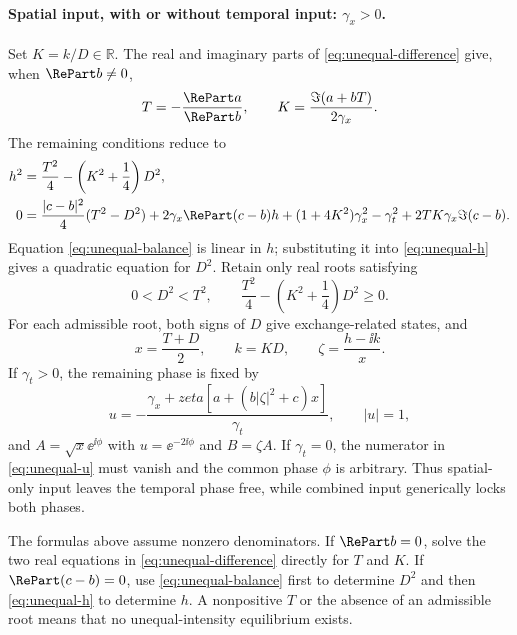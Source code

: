 \paragraph{Spatial input, with or without temporal input: $\gamma_x>0$.}
Set $K=k/D\in\mathbb R$.  The real and imaginary parts of
\eqref{eq:unequal-difference} give, when $\RePart b\neq0$,
\begin{equation}
 T=-\frac{\RePart a}{\RePart b},
 \qquad
 K=\frac{\Im(a+bT)}{2\gamma_x}.
 \label{eq:unequal-TK}
\end{equation}
The remaining conditions reduce to
\begin{subequations}
\label{eq:unequal-scalar-system}
\begin{align}
 h^2&=\frac{T^2}{4}-\left(K^2+\frac14\right)D^2,
 \label{eq:unequal-h}\\
 0&=\frac{|c-b|^2}{4}(T^2-D^2)
 +2\gamma_x\RePart(c-b)h
 +(1+4K^2)\gamma_x^2-\gamma_t^2
 +2TK\gamma_x\Im(c-b).
 \label{eq:unequal-balance}
\end{align}
\end{subequations}
Equation \eqref{eq:unequal-balance} is linear in $h$; substituting it into
\eqref{eq:unequal-h} gives a quadratic equation for $D^2$.  Retain only
real roots satisfying
\begin{equation}
 0<D^2<T^2,
 \qquad
 \frac{T^2}{4}-\left(K^2+\frac14\right)D^2\geq0.
 \label{eq:unequal-admissibility}
\end{equation}
For each admissible root, both signs of $D$ give exchange-related states,
and
\begin{equation}
 x=\frac{T+D}{2},
 \qquad k=KD,
 \qquad \zeta=\frac{h-\ii k}{x}.
 \label{eq:unequal-reconstruction}
\end{equation}
If $\gamma_t>0$, the remaining phase is fixed by
\begin{equation}
 u=-\frac{\gamma_x+zeta
 \left[a+(b|\zeta|^2+c)x\right]}{\gamma_t},
 \qquad |u|=1,
 \label{eq:unequal-u}
\end{equation}
and $A=\sqrt{x}\ee^{\ii\phi}$ with $u=\ee^{-2\ii\phi}$ and $B=\zeta A$.
If $\gamma_t=0$, the numerator in \eqref{eq:unequal-u} must vanish and the
common phase $\phi$ is arbitrary.  Thus spatial-only input leaves the
temporal phase free, while combined input generically locks both phases.

The formulas above assume nonzero denominators.  If $\RePart b=0$, solve
the two real equations in \eqref{eq:unequal-difference} directly for
$T$ and $K$.  If $\RePart(c-b)=0$, use
\eqref{eq:unequal-balance} first to determine $D^2$ and then
\eqref{eq:unequal-h} to determine $h$.  A nonpositive $T$ or the absence
of an admissible root means that no unequal-intensity equilibrium exists.

